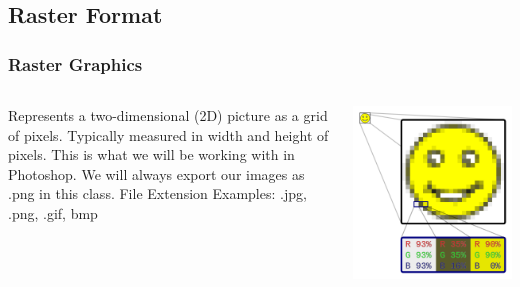 \documentclass{beamer}
\begin{document}
\subsection{Raster Format}
\begin{frame}
	\frametitle{Raster Graphics}
	\begin{columns}
		\vspace{-25pt}
		\begin{outline}
		\1 Represents a two-dimensional (2D) picture as a grid of pixels.
		\1 Typically measured in width and height of pixels.  
		\1 This is what we will be working with in Photoshop.
		\1 We will always export our images as .png in this class.
		\1 File Extension Examples:  
		\2 .jpg, .png, .gif, bmp
		\end{outline}
		\includegraphics[width=1.0\textwidth]{images/800px-Rgb-raster-image.svg.png}
	\end{columns}
\end{frame}
\end{document}
